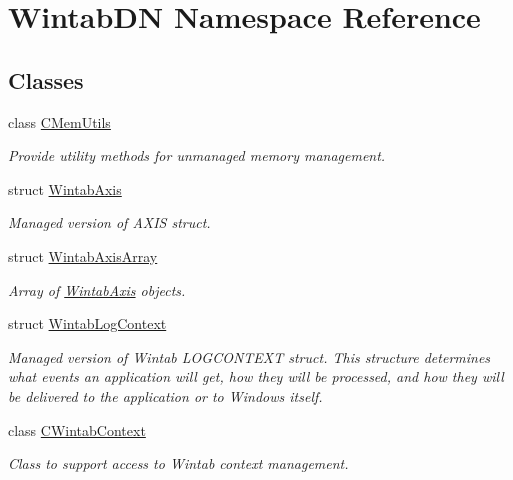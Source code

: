 \hypertarget{namespace_wintab_d_n}{
\section{WintabDN Namespace Reference}
\label{namespace_wintab_d_n}
}
\subsection*{Classes}
\begin{DoxyCompactItemize}
\item 
class \hyperlink{class_wintab_d_n_1_1_c_mem_utils}{CMemUtils}
\begin{DoxyCompactList}\small\item\em Provide utility methods for unmanaged memory management. \item\end{DoxyCompactList}\item 
struct \hyperlink{struct_wintab_d_n_1_1_wintab_axis}{WintabAxis}
\begin{DoxyCompactList}\small\item\em Managed version of AXIS struct. \item\end{DoxyCompactList}\item 
struct \hyperlink{struct_wintab_d_n_1_1_wintab_axis_array}{WintabAxisArray}
\begin{DoxyCompactList}\small\item\em Array of \hyperlink{struct_wintab_d_n_1_1_wintab_axis}{WintabAxis} objects. \item\end{DoxyCompactList}\item 
struct \hyperlink{struct_wintab_d_n_1_1_wintab_log_context}{WintabLogContext}
\begin{DoxyCompactList}\small\item\em Managed version of Wintab LOGCONTEXT struct. This structure determines what events an application will get, how they will be processed, and how they will be delivered to the application or to Windows itself. \item\end{DoxyCompactList}\item 
class \hyperlink{class_wintab_d_n_1_1_c_wintab_context}{CWintabContext}
\begin{DoxyCompactList}\small\item\em Class to support access to Wintab context management. \item\end{DoxyCompactList}\item 

\end{DoxyCompactItemize}
